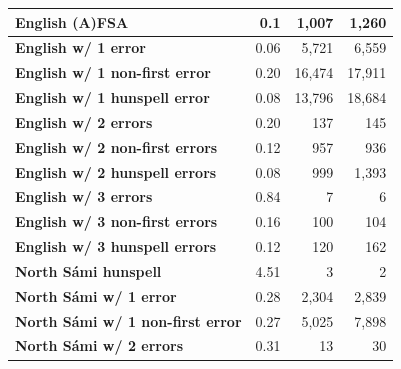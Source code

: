 \documentclass[a4paper,12pt]{article}
\begin{document}
\begin{table}
\begin{tabular}{|l|r|r|r|}
          \bf English (A)FSA & 0.1 & 1,007 & 1,260 \\
        \hline
        \bf English w/ 1 error     & 0.06  & 5,721  & 6,559 \\
 \bf English w/ 1 non-first error  & 0.20  & 16,474 & 17,911  \\
 \bf English w/ 1 hunspell error   & 0.08  & 13,796 & 18,684  \\
     \bf English w/ 2 errors       & 0.20  & 137    & 145  \\
 \bf English w/ 2 non-first errors & 0.12  & 957    & 936 \\
 \bf English w/ 2 hunspell errors  & 0.08  & 999    & 1,393 \\
   \bf English w/ 3 errors         & 0.84  & 7      & 6    \\
 \bf English w/ 3 non-first errors & 0.16  & 100    & 104  \\
 \bf English w/ 3 hunspell errors  & 0.12  & 120    & 162  \\
        \hline
   \bf North Sámi hunspell & 4.51 & 3 & 2 \\
        \hline
        \bf North Sámi w/ 1 error    & 0.28 & 2,304 & 2,839 \\
\bf North Sámi w/ 1 non-first error  & 0.27 & 5,025 & 7,898 \\
       \bf North Sámi w/ 2 errors    & 0.31 & 13    & 30    \\

\end{tabular}
\end{table}
\end{document}
